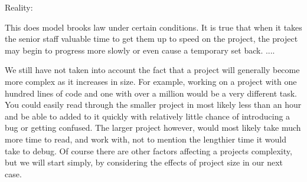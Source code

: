 \documentclass{article}
\newenvironment{atomize}
    {\begin{list} {} {
            \setlength\itemindent{0pt}
            \setlength\leftmargin{10pt}
            \setlength\labelwidth{0pt}
    }}
    {\end{list}}
\begin{document}
\begin{atomize}
    \item Reality:
      \begin{atomize}
          \item This does model brooks law under certain conditions. It is 
          true that when it takes the senior staff valuable time to get them
          up to speed on the project, the project may begin to progress more
          slowly or even cause a temporary set back. ....

          We still have not taken into account the fact that a project will
          generally become more complex as it increases in size. For example,
          working on a project with one hundred lines of code and one with over
          a million would be a very different task. You could easily read
          through the smaller project in most likely less than an hour and be
          able to added to it quickly with relatively little chance of
          introducing a bug or getting confused. The larger project however,
          would most likely take much more time to read, and work with, not to
          mention the lengthier time it would take to debug. Of course there 
          are other factors affecting a projects complexity, but we will start
          simply, by considering the effects of project size in our next case.
          \end{atomize}

  \end{atomize}
\end{document}
